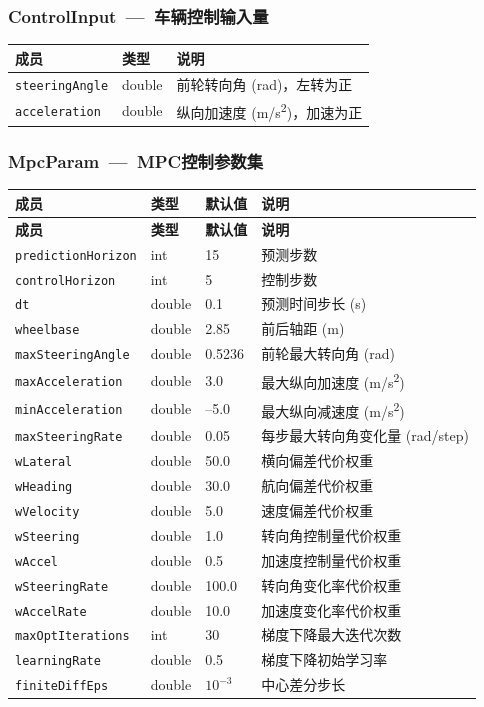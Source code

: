\documentclass[a4paper,10pt]{article}
\begin{document}
\subsubsection{ControlInput~---~车辆控制输入量}
\begin{longtable}{|L{3.5cm}|C{2cm}|L{9.5cm}|}
\hline
\textbf{成员} & \textbf{类型} & \textbf{说明} \\
\hline
\texttt{steeringAngle} & double & 前轮转向角 (rad)，左转为正 \\
\hline
\texttt{acceleration} & double & 纵向加速度 (m/s\textsuperscript{2})，加速为正 \\
\hline
\end{longtable}

\subsubsection{MpcParam~---~MPC控制参数集}
\begin{longtable}{|L{4cm}|C{1.5cm}|C{1.5cm}|L{8cm}|}
\hline
\textbf{成员} & \textbf{类型} & \textbf{默认值} & \textbf{说明} \\
\hline
\endfirsthead
\hline
\textbf{成员} & \textbf{类型} & \textbf{默认值} & \textbf{说明} \\
\hline
\endhead
\texttt{predictionHorizon} & int & 15 & 预测步数 \\
\hline
\texttt{controlHorizon} & int & 5 & 控制步数 \\
\hline
\texttt{dt} & double & 0.1 & 预测时间步长 (s) \\
\hline
\texttt{wheelbase} & double & 2.85 & 前后轴距 (m) \\
\hline
\texttt{maxSteeringAngle} & double & 0.5236 & 前轮最大转向角 (rad) \\
\hline
\texttt{maxAcceleration} & double & 3.0 & 最大纵向加速度 (m/s\textsuperscript{2}) \\
\hline
\texttt{minAcceleration} & double & --5.0 & 最大纵向减速度 (m/s\textsuperscript{2}) \\
\hline
\texttt{maxSteeringRate} & double & 0.05 & 每步最大转向角变化量 (rad/step) \\
\hline
\texttt{wLateral} & double & 50.0 & 横向偏差代价权重 \\
\hline
\texttt{wHeading} & double & 30.0 & 航向偏差代价权重 \\
\hline
\texttt{wVelocity} & double & 5.0 & 速度偏差代价权重 \\
\hline
\texttt{wSteering} & double & 1.0 & 转向角控制量代价权重 \\
\hline
\texttt{wAccel} & double & 0.5 & 加速度控制量代价权重 \\
\hline
\texttt{wSteeringRate} & double & 100.0 & 转向角变化率代价权重 \\
\hline
\texttt{wAccelRate} & double & 10.0 & 加速度变化率代价权重 \\
\hline
\texttt{maxOptIterations} & int & 30 & 梯度下降最大迭代次数 \\
\hline
\texttt{learningRate} & double & 0.5 & 梯度下降初始学习率 \\
\hline
\texttt{finiteDiffEps} & double & $10^{-3}$ & 中心差分步长 \\
\hline
\end{longtable}
\end{document}
